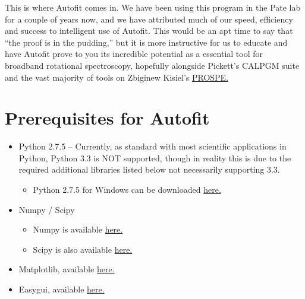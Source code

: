 \documentclass[letterpaper,10pt,english]{sphinxmanual}
\begin{document}
This is where Autofit comes in. We have been using this program in the Pate lab for a couple of years now, and we have attributed much of our speed, efficiency and success to intelligent use of Autofit. This would be an apt time to say that ``the proof is in the pudding,''
but it is more instructive for us to educate and have Autofit prove to you its incredible potential as a essential tool for broadband rotational spectroscopy, hopefully alongside Pickett's CALPGM suite and the vast majority of tools on Zbiginew Kisiel's \href{http://info.ifpan.edu.pl/~kisiel/prospe.htm}{PROSPE.}


\section{Prerequisites for Autofit}
\label{gettingstarted:prerequisites-for-autofit}\begin{itemize}
\item {} 
Python 2.7.5 -- Currently, as standard with most scientific applications in Python, Python 3.3 is NOT supported, though in reality this is due to the required additional libraries listed below not necessarily supporting 3.3.
\begin{itemize}
\item {} 
Python 2.7.5 for Windows can be downloaded \href{http://www.python.org/getit/}{here.}

\end{itemize}

\item {} 
Numpy / Scipy
\begin{itemize}
\item {} 
Numpy is available \href{https://pypi.python.org/pypi/numpy}{here.}

\item {} 
Scipy is also available \href{http://sourceforge.net/projects/scipy/files/scipy/0.12.0/scipy-0.12.0-win32-superpack-python2.7.exe}{here.}

\end{itemize}

\item {} 
Matplotlib, available \href{http://matplotlib.org/}{here.}

\item {} 
Easygui, available \href{http://easygui.sourceforge.net/}{here.}

\end{itemize}
\end{document}
